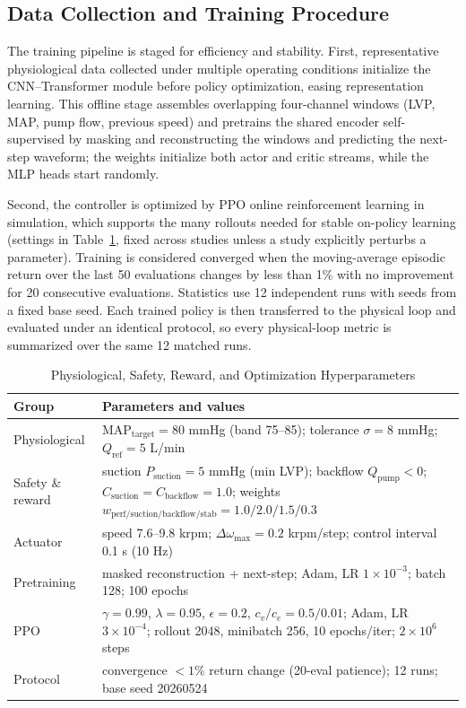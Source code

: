 \documentclass[sigconf]{acmart}
\begin{document}
\subsection{Data Collection and Training Procedure}
\label{sec:data_training}
The training pipeline is staged for efficiency and stability. First, representative physiological data collected under multiple operating conditions initialize the CNN--Transformer module before policy optimization, easing representation learning. This offline stage assembles overlapping four-channel windows (LVP, MAP, pump flow, previous speed) and pretrains the shared encoder self-supervised by masking and reconstructing the windows and predicting the next-step waveform; the weights initialize both actor and critic streams, while the MLP heads start randomly.

Second, the controller is optimized by PPO online reinforcement learning in simulation, which supports the many rollouts needed for stable on-policy learning (settings in Table~\ref{tab:hyperparameters}, fixed across studies unless a study explicitly perturbs a parameter). Training is considered converged when the moving-average episodic return over the last 50 evaluations changes by less than 1\% with no improvement for 20 consecutive evaluations. Statistics use 12 independent runs with seeds from a fixed base seed. Each trained policy is then transferred to the physical loop and evaluated under an identical protocol, so every physical-loop metric is summarized over the same 12 matched runs.

\begin{table}[!b]
\caption{Physiological, Safety, Reward, and Optimization Hyperparameters}
\label{tab:hyperparameters}
\centering
\footnotesize
\setlength{\tabcolsep}{4pt}
\renewcommand{\arraystretch}{1.1}
\begin{tabular}{@{}l p{}@{}}
\toprule
\textbf{Group} & \textbf{Parameters and values} \\
\midrule
Physiological & $\mathrm{MAP}_{\mathrm{target}}=80$ mmHg (band 75--85); tolerance $\sigma=8$ mmHg; $Q_{\mathrm{ref}}=5$ L/min \\
Safety \& reward & suction $P_{\mathrm{suction}}=5$ mmHg (min LVP); backflow $Q_{\mathrm{pump}}<0$; $C_{\mathrm{suction}}=C_{\mathrm{backflow}}=1.0$; weights $w_{\mathrm{perf/suction/backflow/stab}}=1.0/2.0/1.5/0.3$ \\
Actuator & speed 7.6--9.8 krpm; $\Delta\omega_{\max}=0.2$ krpm/step; control interval 0.1 s (10 Hz) \\
Pretraining & masked reconstruction + next-step; Adam, LR $1\times10^{-3}$; batch 128; 100 epochs \\
PPO & $\gamma{=}0.99$, $\lambda{=}0.95$, $\epsilon{=}0.2$, $c_v/c_e{=}0.5/0.01$; Adam, LR $3\times10^{-4}$; rollout 2048, minibatch 256, 10 epochs/iter; $2\times10^{6}$ steps \\
Protocol & convergence $<1\%$ return change (20-eval patience); 12 runs; base seed 20260524 \\
\bottomrule
\end{tabular}
\end{table}
\end{document}
